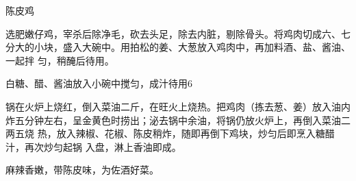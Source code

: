 \begin{recipe}{陈皮鸡}

\ingredients


\preparation

\step 选肥嫩仔鸡，宰杀后除净毛，砍去头足，除去内脏，剔除骨头。将鸡肉切成六、七
分大的小块，盛入大碗中。用拍松的姜、大葱放入鸡肉中，再加料酒、盐、酱油、一起拌
匀，稍醃后待用。

\step 白糖、醋、酱油放入小碗中搅匀，成汁待用6

\step 锅在火炉上烧红，倒入菜油二斤，在旺火上烧热。把鸡肉（拣去葱、姜）放入油内
炸五分钟左右，呈金黄色时捞出；泌去锅中余油，将锅仍放火炉上，再倒入菜油二两五烧
热，放入辣椒、花椒、陈皮稍炸，随即再倒下鸡块，炒匀后即烹入糖醋汁，再次炒匀起锅
入盘，淋上香油即成。

\features

麻辣香嫩，带陈皮味，为佐酒好菜。

\end{recipe}

